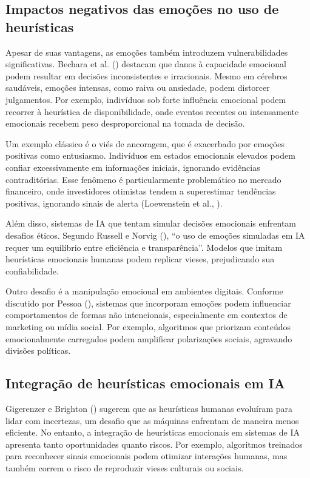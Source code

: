 \documentclass[a4paper,12pt]{report}
\begin{document}
	\subsection{Impactos negativos das emoções no uso de heurísticas}
	
	Apesar de suas vantagens, as emoções também introduzem vulnerabilidades significativas. Bechara et al. (\citeyear{bechara2000}) destacam que danos à capacidade emocional podem resultar em decisões inconsistentes e irracionais. Mesmo em cérebros saudáveis, emoções intensas, como raiva ou ansiedade, podem distorcer julgamentos. Por exemplo, indivíduos sob forte influência emocional podem recorrer à heurística de disponibilidade, onde eventos recentes ou intensamente emocionais recebem peso desproporcional na tomada de decisão.
	
	Um exemplo clássico é o viés de ancoragem, que é exacerbado por emoções positivas como entusiasmo. Indivíduos em estados emocionais elevados podem confiar excessivamente em informações iniciais, ignorando evidências contraditórias. Esse fenômeno é particularmente problemático no mercado financeiro, onde investidores otimistas tendem a superestimar tendências positivas, ignorando sinais de alerta (Loewenstein et al., \citeyear{loewenstein2001}).
	
	Além disso, sistemas de IA que tentam simular decisões emocionais enfrentam desafios éticos. Segundo Russell e Norvig (\citeyear{russell2020}), “o uso de emoções simuladas em IA requer um equilíbrio entre eficiência e transparência”. Modelos que imitam heurísticas emocionais humanas podem replicar vieses, prejudicando sua confiabilidade.
	
	Outro desafio é a manipulação emocional em ambientes digitais. Conforme discutido por Pessoa (\citeyear{pessoa2008}), sistemas que incorporam emoções podem influenciar comportamentos de formas não intencionais, especialmente em contextos de marketing ou mídia social. Por exemplo, algoritmos que priorizam conteúdos emocionalmente carregados podem amplificar polarizações sociais, agravando divisões políticas.
	
	\subsection{Integração de heurísticas emocionais em IA}
	
	Gigerenzer e Brighton (\citeyear{gigerenzer2009}) sugerem que as heurísticas humanas evoluíram para lidar com incertezas, um desafio que as máquinas enfrentam de maneira menos eficiente. No entanto, a integração de heurísticas emocionais em sistemas de IA apresenta tanto oportunidades quanto riscos. Por exemplo, algoritmos treinados para reconhecer sinais emocionais podem otimizar interações humanas, mas também correm o risco de reproduzir vieses culturais ou sociais.
	
\end{document}
